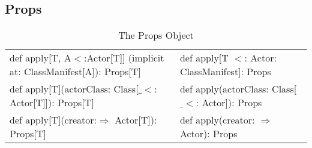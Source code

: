\subsection{Props}

\begin{table}[h]\footnotesize
  \caption{The Props Object}
  \label{props_object}
  \centering
  \begin{tabular}{ l ||  l }
def apply[T, A$<$:Actor[T]] (implicit at: ClassManifest[A]): Props[T] &  
def apply[T $<$: Actor: ClassManifest]: Props
\\

def apply[T](actorClass: Class[$\_ <$: Actor[T]]): Props[T]&
def apply(actorClass: Class[$\_ <$: Actor]): Props\\

def apply[T](creator:$\Rightarrow$ Actor[T]): Props[T]&
def apply(creator: $\Rightarrow$ Actor): Props\\


  \end{tabular}
\end{table}


\begin{comment}

\subsection{ActorRef}
\begin{table}[h]\footnotesize
  \caption{The ActorRef Class}
  \label{actorRef_class}
  \centering
  \begin{tabular}{ l ||  l }
abstract class ActorRef[-Msg : Manifest] &  
class ActorRef\\

  \end{tabular}
\end{table}


\subsection{ActorRef}
\begin{table}[h]\footnotesize
  \caption{The ActorRef Class}
  \label{actorRef_class}
  \centering
  \begin{tabular}{ l ||  l }
abstract class ActorRef[-Msg : Manifest] &  
class ActorRef\\

  \end{tabular}
\end{table}

\end{comment}